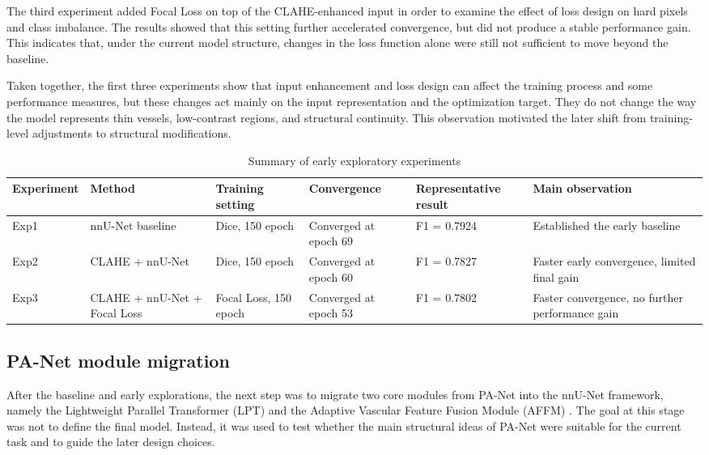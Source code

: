 \documentclass[a4paper,12pt]{article}
\begin{document}
The third experiment added Focal Loss on top of the CLAHE-enhanced input in order to examine the effect of loss design on hard pixels and class imbalance. The results showed that this setting further accelerated convergence, but did not produce a stable performance gain. This indicates that, under the current model structure, changes in the loss function alone were still not sufficient to move beyond the baseline.

Taken together, the first three experiments show that input enhancement and loss design can affect the training process and some performance measures, but these changes act mainly on the input representation and the optimization target. They do not change the way the model represents thin vessels, low-contrast regions, and structural continuity. This observation motivated the later shift from training-level adjustments to structural modifications.

\begin{table}[htbp]
\centering
\caption{Summary of early exploratory experiments}
\label{tab:early_experiments_en}
\begin{tabular}{llllll}
\hline
Experiment & Method & Training setting & Convergence & Representative result & Main observation \\
\hline
Exp1 & nnU-Net baseline & Dice, 150 epoch & Converged at epoch 69 & F1 = 0.7924 & Established the early baseline \\
Exp2 & CLAHE + nnU-Net & Dice, 150 epoch & Converged at epoch 60 & F1 = 0.7827 & Faster early convergence, limited final gain \\
Exp3 & CLAHE + nnU-Net + Focal Loss & Focal Loss, 150 epoch & Converged at epoch 53 & F1 = 0.7802 & Faster convergence, no further performance gain \\
\hline
\end{tabular}
\end{table}

\subsection{PA-Net module migration}

After the baseline and early explorations, the next step was to migrate two core modules from PA-Net into the nnU-Net framework, namely the Lightweight Parallel Transformer (LPT) and the Adaptive Vascular Feature Fusion Module (AFFM) \cite{luo2025panet}. The goal at this stage was not to define the final model. Instead, it was used to test whether the main structural ideas of PA-Net were suitable for the current task and to guide the later design choices.
\end{document}
